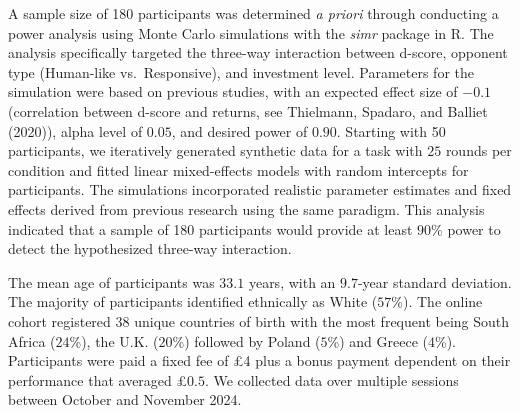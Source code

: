 \documentclass[
]{article}
\begin{document}
A sample size of 180 participants was determined \emph{a priori} through conducting a power analysis using Monte Carlo simulations with the \emph{simr} package in R. The analysis specifically targeted the three-way interaction between d-score, opponent type (Human-like vs.~Responsive), and investment level. Parameters for the simulation were based on previous studies, with an expected effect size of \(-0.1\) (correlation between d-score and returns, see Thielmann, Spadaro, and Balliet (2020)), alpha level of \(0.05\), and desired power of \(0.90\). Starting with 50 participants, we iteratively generated synthetic data for a task with \(25\) rounds per condition and fitted linear mixed-effects models with random intercepts for participants. The simulations incorporated realistic parameter estimates and fixed effects derived from previous research using the same paradigm. This analysis indicated that a sample of 180 participants would provide at least \(90\%\) power to detect the hypothesized three-way interaction.

The mean age of participants was \(33.1\) years, with an \(9.7\)-year standard deviation. The majority of participants identified ethnically as White (\(57\)\%). The online cohort registered \(38\) unique countries of birth with the most frequent being South Africa (\(24\)\%), the U.K. (\(20\)\%) followed by Poland (\(5\)\%) and Greece (\(4\)\%). Participants were paid a fixed fee of £4 plus a bonus payment dependent on their performance that averaged £\(0.5\). We collected data over multiple sessions between October and November 2024.
\end{document}
